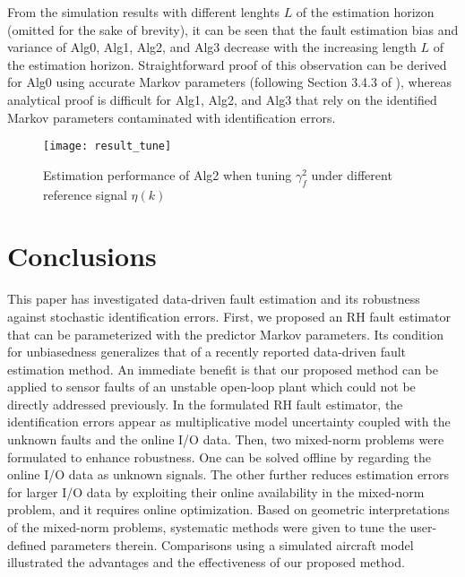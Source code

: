 \documentclass[twocolumn]{autart}
\begin{document}
From the simulation results with different lenghts $L$ of the estimation horizon (omitted for the sake of brevity), it can be seen that the fault estimation bias and variance of Alg0, Alg1, Alg2, and Alg3 decrease with the increasing length $L$ of the estimation horizon. Straightforward proof of this observation can be derived for Alg0 using accurate Markov parameters (following Section 3.4.3 of \cite{Kailath2000}), whereas analytical proof is difficult for Alg1, Alg2, and Alg3 that rely on the identified Markov parameters contaminated with identification errors.

\begin{figure}[h]
\centering
\texttt{[image: result\_tune]}
\caption{Estimation performance of Alg2 when tuning $\gamma_f^2$ under different reference signal $\eta(k)$}
\label{fig:result_tune}
\end{figure}










\section{Conclusions}
This paper has investigated data-driven fault estimation and its robustness against stochastic identification errors. First, we proposed an RH fault estimator that can be parameterized with the predictor Markov parameters. Its condition for unbiasedness generalizes that of a recently reported data-driven fault estimation method. An immediate benefit is that our proposed method can be applied to sensor faults of an unstable open-loop plant which could not be directly addressed previously. In the formulated RH fault estimator, the identification errors appear as multiplicative model uncertainty coupled with the unknown faults and the online I/O data. Then, two mixed-norm problems were formulated to enhance robustness. One can be solved offline by regarding the online I/O data as unknown signals. The other further reduces estimation errors for larger I/O data by exploiting their online availability in the mixed-norm problem, and it requires online optimization. Based on geometric interpretations of the mixed-norm problems, systematic methods were given to tune the user-defined parameters therein. 
Comparisons using a simulated aircraft model illustrated the advantages and the effectiveness of our proposed method.
\end{document}
